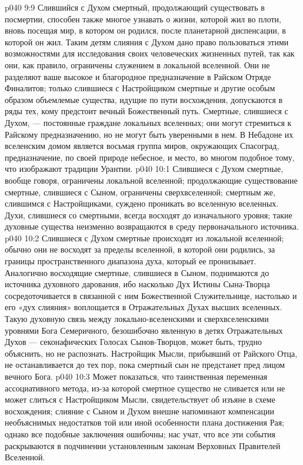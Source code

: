 \vs p040 9:9 \pc Слившийся с Духом смертный, продолжающий существовать в посмертии, способен также многое узнавать о жизни, которой жил во плоти, вновь посещая мир, в котором он родился, после планетарной диспенсации, в которой он жил. Таким детям слияния с Духом дано право пользоваться этими возможностями для исследования своих человеческих жизненных путей, так как они, как правило, ограничены служением в локальной вселенной. Они не разделяют ваше высокое и благородное предназначение в Райском Отряде Финалитов; только слившиеся с Настройщиком смертные и другие особым образом объемлемые существа, идущие по пути восхождения, допускаются в ряды тех, кому предстоит вечный Божественный путь. Смертные, слившиеся с Духом, --- постоянные граждане локальных вселенных; они могут стремиться к Райскому предназначению, но не могут быть уверенными в нем. В Небадоне их вселенским домом является восьмая группа миров, окружающих Спасоград, предназначение, по своей природе небесное, и место, во многом подобное тому, что изображают традиции Урантии.
\vs p040 10:1 Слившиеся с Духом смертные, вообще говоря, ограничены локальной вселенной; продолжающие существование смертные, слившиеся с Сыном, ограничены сверхвселенной; смертным же, слившимся с Настройщиками, суждено проникать во вселенную вселенных. Духи, слившиеся со смертными, всегда восходят до изначального уровня; такие духовные существа неизменно возвращаются в среду первоначального источника.
\vs p040 10:2 Слившиеся с Духом смертные происходят из локальной вселенной; обычно они не восходят за пределы вселенной, в которой они родились, за границы пространственного диапазона духа, который ее пронизывает. Аналогично восходящие смертные, слившиеся в Сыном, поднимаются до источника духовного дарования, ибо насколько Дух Истины Сына\hyp{}Творца сосредоточивается в связанной с ним Божественной Служительнице, настолько и его «дух слияния» воплощается в Отражательных Духах высших вселенных. Такую духовную связь между локально\hyp{}вселенскими и сверхвселенскими уровнями Бога Семеричного, безошибочно явленную в детях Отражательных Духов --- секонафических Голосах Сынов\hyp{}Творцов, может быть, трудно объяснить, но не распознать. Настройщик Мысли, прибывший от Райского Отца, не останавливается до тех пор, пока смертный сын не предстанет пред лицом вечного Бога.
\vs p040 10:3 \pc Может показаться, что таинственная переменная ассоциативного метода, из\hyp{}за которой смертное существо не сливается или не может слиться с Настройщиком Мысли, свидетельствует об изъяне в схеме восхождения; слияние с Сыном и Духом внешне напоминают компенсации необъяснимых недостатков той или иной особенности плана достижения Рая; однако все подобные заключения ошибочны; нас учат, что все эти события раскрываются в подчинении установленным законам Верховных Правителей Вселенной.
